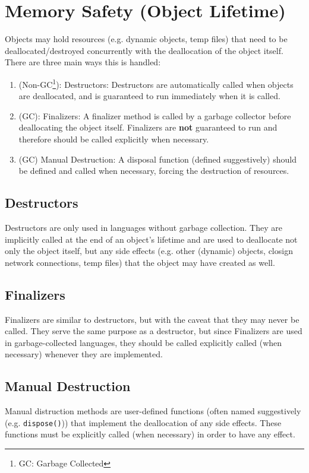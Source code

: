 \documentclass{article}
\begin{document}
\section{Memory Safety (Object Lifetime)}
Objects may hold resources (e.g. dynamic objects, temp files) that
need to be deallocated/destroyed concurrently with the deallocation of
the object itself. There are three main ways this is handled:
\begin{enumerate}[label=(\roman*)]
\item (Non-GC\footnote{GC: Garbage Collected}): Destructors:
  Destructors are automatically called when objects are deallocated,
  and is guaranteed to run immediately when it is called.
\item (GC): Finalizers: A finalizer method is called by a garbage
  collector before deallocating the object itself. Finalizers are
  \textbf{not} guaranteed to run and therefore should be called
  explicitly when necessary.
\item (GC) Manual Destruction: A disposal function (defined
  suggestively) should be defined and called when necessary, forcing
  the destruction of resources.
\end{enumerate}

\subsection{Destructors}
Destructors are only used in languages without garbage
collection. They are implicitly called at the end of an object's
lifetime and are used to deallocate not only the object itself, but any side
effects (e.g. other (dynamic) objects, closign network connections,
temp files) that the object may have created as well.

\subsection{Finalizers}
Finalizers are similar to destructors, but with the caveat that they
may never be called. They serve the same purpose as a destructor, but
since Finalizers are used in garbage-collected languages, they should
be called explicitly called (when necessary) whenever they are
implemented.

\subsection{Manual Destruction}
Manual distruction methods are user-defined functions (often named
suggestively (e.g. \texttt{dispose()})) that implement the
deallocation of any side effects. These functions must be explicitly
called (when necessary) in order to have any effect.
\end{document}
